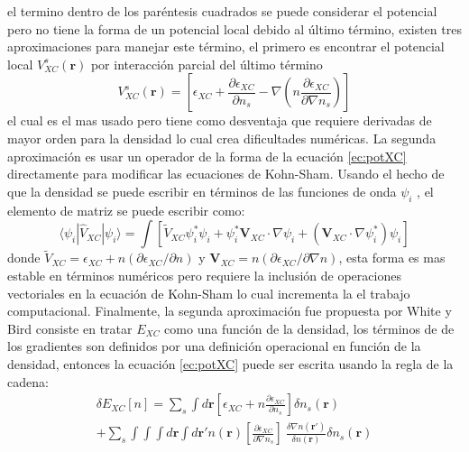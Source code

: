 \documentclass[12pt,a4paper, oneside]{book}
\begin{document}
   el termino dentro de los par\'entesis cuadrados se puede considerar el potencial pero no tiene la forma de un potencial local debido al \'ultimo t\'ermino, existen tres aproximaciones para manejar este t\'ermino, el primero es encontrar el potencial local $V_{XC}^s (\pmb{r})$ por interacci\'on parcial del \'ultimo  t\'ermino
   \begin{equation}
   V_{XC}^s (\pmb{r}) = \left[\epsilon_{XC}+\frac{\partial \epsilon_{XC}}{\partial n_s}- \nabla \left(n \frac{\partial \epsilon_{XC}}{\partial \nabla n_s}\right) \right] \label{ec:potXC_2}
   \end{equation}
   el cual es el mas usado pero tiene como desventaja que requiere derivadas de mayor orden para la densidad lo cual crea dificultades num\'ericas.
   \newline
   La segunda aproximaci\'on es usar un operador de la forma de la ecuaci\'on \ref{ec:potXC} directamente para modificar las ecuaciones de Kohn-Sham. Usando el hecho de que la densidad se puede escribir en t\'erminos de las funciones de onda $\psi_i$ , el elemento de matriz se puede escribir como:
   \begin{equation}
   \langle \psi_i |\hat{V}_{XC}| \psi_i \rangle = \int \left[\tilde{V}_{XC} \psi_i ^* \psi_i + \psi_i ^* \pmb{V}_{XC} \cdot \nabla \psi_i + (\pmb{V}_{XC} \cdot \nabla \psi_i^*) \psi_i \right] \label{ec:potXC_3}
   \end{equation}
   donde $\tilde{V}_{XC} = \epsilon_{XC} + n (\partial \epsilon_{XC}/ \partial n)$ y $\pmb{V}_{XC} = n (\partial \epsilon_{XC} / \partial \nabla n) $, esta forma es mas estable en t\'erminos num\'ericos pero requiere la inclusi\'on de operaciones vectoriales en la ecuaci\'on de Kohn-Sham lo cual incrementa la el trabajo computacional.
   \newline
   Finalmente, la segunda aproximaci\'on fue propuesta por White y Bird consiste en tratar $E_{XC}$ como una funci\'on de la densidad, los t\'erminos de de los gradientes son definidos por una definici\'on operacional en funci\'on de la densidad, entonces la ecuaci\'on \ref{ec:potXC} puede ser escrita usando la regla de la cadena:
   \begin{multline}
   \delta E_{XC} [n] = \sum_{s} \int d \pmb{r} \left[\epsilon_{XC} + n \frac{\partial \epsilon_{XC}}{\partial n_s} \right] \delta n_s (\pmb{r}) \\
   + \sum_{s} \int \int \int d \pmb{r} \int d \pmb{r'} n(\pmb{r}) \left[\frac{\partial \epsilon_{XC}}{\partial \nabla n_s} \right] ~ \frac{\delta \nabla n(\pmb{r'})}{\delta n(\pmb{r})} \delta n_s (\pmb{r}) \label{ec:potXC_4}
   \end{multline}
\end{document}
